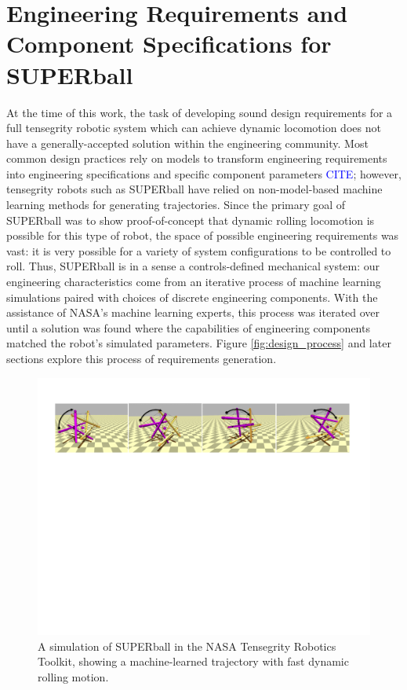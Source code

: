 \documentclass[12pt]{report}
\begin{document}
\chapter{Engineering Requirements and Component Specifications for SUPERball}

At the time of this work, the task of developing sound design requirements for a full tensegrity robotic system which can achieve dynamic locomotion does not have a generally-accepted solution within the engineering community.
Most common design practices rely on models to transform engineering requirements into engineering specifications and specific component parameters \textcolor{blue}{CITE}; however, tensegrity robots such as SUPERball have relied on non-model-based machine learning methods for generating trajectories.
Since the primary goal of SUPERball was to show proof-of-concept that dynamic rolling locomotion is possible for this type of robot, the space of possible engineering requirements was vast: it is very possible for a variety of system configurations to be controlled to roll.
Thus, SUPERball is in a sense a controls-defined mechanical system: our engineering characteristics come from an iterative process of machine learning simulations paired with choices of discrete engineering components.
With the assistance of NASA's machine learning experts, this process was iterated over until a solution was found where the capabilities of engineering components matched the robot's simulated parameters.
Figure \ref{fig:design_process} and later sections explore this process of requirements generation.

\begin{figure}[thpb]
      \centering
      \includegraphics[width=0.9\columnwidth]{img/fig_rolling.pdf}
      \caption{A simulation of SUPERball in the NASA Tensegrity Robotics Toolkit, showing a machine-learned trajectory with fast dynamic rolling motion.}
      \label{fig:superball_rolling_ntrt}
      \vspace{-0.2cm}
\end{figure}
\end{document}
